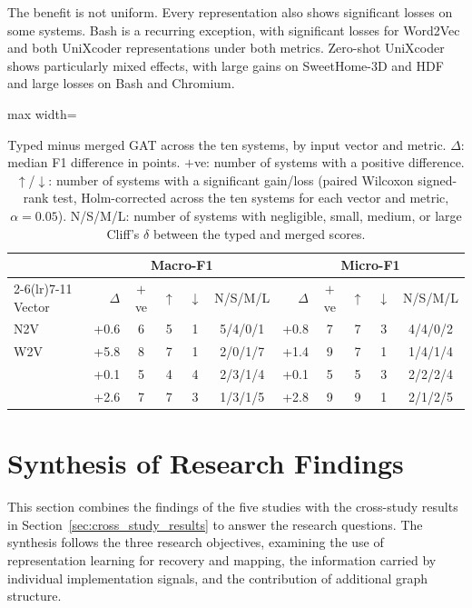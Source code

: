 The benefit is not uniform. Every representation also shows significant losses on some systems. Bash is a recurring exception, with significant losses for Word2Vec and both UniXcoder representations under both metrics. Zero-shot UniXcoder shows particularly mixed effects, with large gains on SweetHome-3D and HDF and large losses on Bash and Chromium.

\begin{table}[!htb]
\centering
\caption[Typed versus merged GAT across file representations.]{Typed minus merged GAT across the ten systems, by input vector and metric. $\Delta$: median F1 difference in points. $+$ve: number of systems with a positive difference. $\uparrow$/$\downarrow$: number of systems with a significant gain/loss (paired Wilcoxon signed-rank test, Holm-corrected across the ten systems for each vector and metric, $\alpha=0.05$). N/S/M/L: number of systems with negligible, small, medium, or large Cliff's $\delta$ between the typed and merged scores.}
\label{tab:gat_typed_summary}
\begin{adjustbox}{max width=\linewidth}
\renewcommand{\arraystretch}{1.1}
\begin{tabular}{l rcccc rcccc}
\toprule
& \multicolumn{5}{c}{Macro-F1}
& \multicolumn{5}{c}{Micro-F1} \\
\cmidrule(lr){2-6}\cmidrule(lr){7-11}
Vector
& $\Delta$ & $+$ve & $\uparrow$ & $\downarrow$ & N/S/M/L
& $\Delta$ & $+$ve & $\uparrow$ & $\downarrow$ & N/S/M/L \\
\midrule
N2V   & +0.6 & 6 & 5 & 1 & 5/4/0/1 & +0.8 & 7 & 7 & 3 & 4/4/0/2 \\
W2V   & +5.8 & 8 & 7 & 1 & 2/0/1/7 & +1.4 & 9 & 7 & 1 & 1/4/1/4 \\
\zs{} & +0.1 & 5 & 4 & 4 & 2/3/1/4 & +0.1 & 5 & 5 & 3 & 2/2/2/4 \\
\ft{} & +2.6 & 7 & 7 & 3 & 1/3/1/5 & +2.8 & 9 & 9 & 1 & 2/1/2/5 \\
\bottomrule
\end{tabular}
\end{adjustbox}
\end{table}
% 
\section{Synthesis of Research Findings \label{sec:contruibutions}}

This section combines the findings of the five studies with the cross-study results in Section~\ref{sec:cross_study_results} to answer the research questions. The synthesis follows the three research objectives, examining the use of representation learning for recovery and mapping, the information carried by individual implementation signals, and the contribution of additional graph structure.

